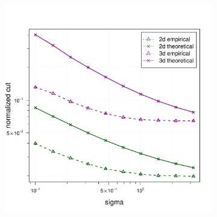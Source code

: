 \documentclass{article}
\newcommand{\1}{\mathbf{1}}
\theoremstyle{aldenthm}
\theoremstyle{aldenrmrk}
\begin{document}
\begin{figure}
\begin{adjustbox}{minipage=\linewidth,scale=0.8}
\begin{subfigure}{.33\linewidth}
			\caption{}
		\end{subfigure}
		\begin{subfigure}{.33\linewidth}
			\includegraphics[width=\linewidth]{example1plots/sigma_normalized_cut_plot}
			\caption{}
		\end{subfigure}
		

\end{adjustbox}
\end{figure}
\end{document}
